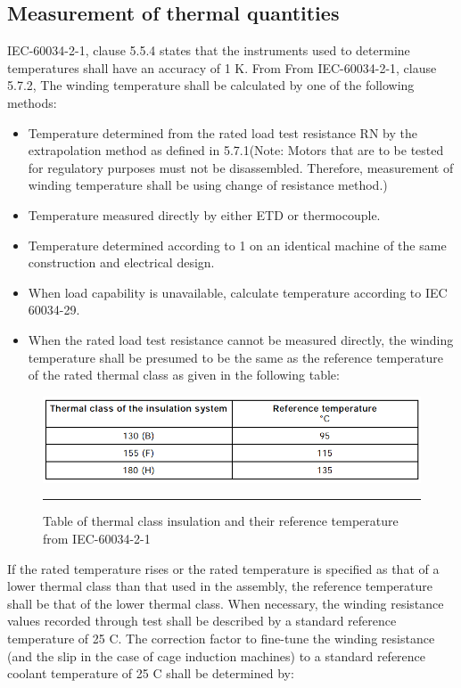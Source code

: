 \subsection{Measurement of thermal quantities}
IEC-60034-2-1, clause 5.5.4 states that the instruments used to determine temperatures shall have an accuracy of 1 K. 
From From IEC-60034-2-1, clause 5.7.2, The winding temperature shall be calculated by one of the following methods:
\begin{itemize}
	\item Temperature determined from the rated load test resistance RN by the extrapolation method as defined in 5.7.1(Note: Motors that are to be tested for regulatory purposes must not be disassembled. Therefore, measurement of winding temperature shall be using change of resistance method.)
	\item Temperature measured directly by either ETD or thermocouple.
	\item Temperature determined according to 1 on an identical machine of the same construction and electrical design.
	\item When load capability is unavailable, calculate temperature according to IEC 60034-29.
	\item When the rated load test resistance cannot be measured directly, the winding temperature shall be presumed to be the same as the reference temperature of the rated thermal class as given in the following table:
\end{itemize}
\begin{figure}[htbp]
	\centering
		\includegraphics[width = 4.5in]{./Figures/MS/fig310.png}
		\rule{35em}{0.5pt}
	\caption{Table of thermal class insulation and their reference temperature from IEC-60034-2-1}
	\label{fig:Table of thermal class insulation and their reference temperature from IEC-60034-2-1} 
\end{figure}


If the rated temperature rises or the rated temperature is specified as that of a lower thermal class than that used in the assembly, the reference temperature shall be that of the lower thermal class. When necessary, the winding resistance values recorded through test shall be described by a standard reference temperature of 25 \textdegree C. The correction factor to fine-tune the winding resistance (and the slip in the case of cage induction machines) to a standard reference coolant temperature of 25 \textdegree C shall be determined by:


